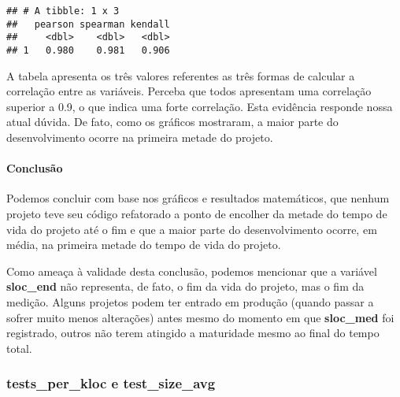 \documentclass[]{article}
\newenvironment{Shaded}{\begin{snugshade}}{\end{snugshade}}
\newcommand{\KeywordTok}[1]{\textcolor[rgb]{0.13,0.29,0.53}{\textbf{#1}}}
\newcommand{\DataTypeTok}[1]{\textcolor[rgb]{0.13,0.29,0.53}{#1}}
\newcommand{\StringTok}[1]{\textcolor[rgb]{0.31,0.60,0.02}{#1}}
\newcommand{\OperatorTok}[1]{\textcolor[rgb]{0.81,0.36,0.00}{\textbf{#1}}}
\newcommand{\NormalTok}[1]{#1}
\let\oldparagraph\paragraph
\renewcommand{\paragraph}[1]{\oldparagraph{#1}\mbox{}}
\begin{document}
\begin{Shaded}
\end{Shaded}

\begin{verbatim}
## # A tibble: 1 x 3
##   pearson spearman kendall
##     <dbl>    <dbl>   <dbl>
## 1   0.980    0.981   0.906
\end{verbatim}

A tabela apresenta os três valores referentes as três formas de calcular
a correlação entre as variáveis. Perceba que todos apresentam uma
correlação superior a 0.9, o que indica uma forte correlação. Esta
evidência responde nossa atual dúvida. De fato, como os gráficos
mostraram, a maior parte do desenvolvimento ocorre na primeira metade do
projeto.

\paragraph{Conclusão}\label{conclusao}

Podemos concluir com base nos gráficos e resultados matemáticos, que
nenhum projeto teve seu código refatorado a ponto de encolher da metade
do tempo de vida do projeto até o fim e que a maior parte do
desenvolvimento ocorre, em média, na primeira metade do tempo de vida do
projeto.

Como ameaça à validade desta conclusão, podemos mencionar que a variável
\textbf{sloc\_end} não representa, de fato, o fim da vida do projeto,
mas o fim da medição. Alguns projetos podem ter entrado em produção
(quando passar a sofrer muito menos alterações) antes mesmo do momento
em que \textbf{sloc\_med} foi registrado, outros não terem atingido a
maturidade mesmo ao final do tempo total.

\subsubsection{\texorpdfstring{\textbf{tests\_per\_kloc} e
\textbf{test\_size\_avg}}{tests\_per\_kloc e test\_size\_avg}}\label{tests_per_kloc-e-test_size_avg}
\end{document}
